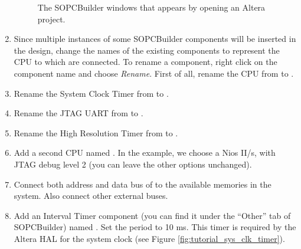 \begin{enumerate}
\begin{figure}
\caption{\label{fig:tutorial_sopcbuilder_standard}The SOPCBuilder
windows that appears by opening an Altera project.}
\end{figure}


\item Since multiple instances of some SOPCBuilder components will be
  inserted in the design, change the names of the existing components
  to represent the CPU to which are connected. To rename a component,
  right click on the component name and choose {\em Rename}. First of
  all, rename the CPU from  to .

\item Rename the System Clock Timer from 
  to .

\item Rename the JTAG UART from  to
  .

\item Rename the High Resolution Timer from  to
  .

\item Add a second CPU named . In the example, we choose
  a Nios II/s, with JTAG debug level 2 (you can leave the other
  options unchanged).

\item Connect both address and data bus of  to the
  available memories in the system. Also connect other external buses.

\item Add an Interval Timer component (you can find it under the
  ``Other'' tab of SOPCBuilder) named . Set the
  period to 10 ms. This timer is required by the Altera HAL for the
  system clock (see Figure \ref{fig:tutorial_sys_clk_timer}).
%
\begin{figure}


\end{figure}
\end{enumerate}
